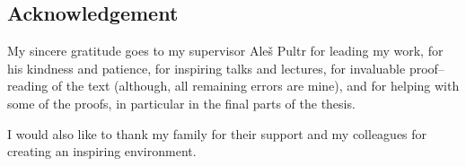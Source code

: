 \subsection*{Acknowledgement}

My sincere gratitude goes to my supervisor Ale\v s Pultr for leading my work, for his kindness and patience,
for inspiring talks and lectures,
for invaluable proof--reading of the text (although, all remaining errors are mine),
and for helping with some of the proofs, in particular in the final parts of the thesis.

I would also like to thank my family for their support and my colleagues for creating an inspiring environment.


